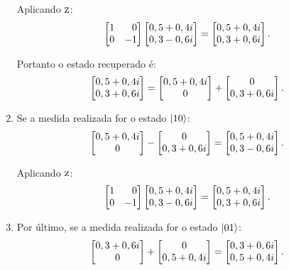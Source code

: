 \begin{enumerate}
        Aplicando \(\operatorname{\textsc{z}}\):
        \[
        \begin{bmatrix*}[r] 1 & 0 \\ 0 & -1 \end{bmatrix*}\begin{bmatrix*}[r] {\norma} \\ {0,3-0,6i} \end{bmatrix*} = \begin{bmatrix} {\norma} \\ {\normb} \end{bmatrix}.
        \]

        Portanto o estado recuperado é:
        \[
        \begin{bmatrix} {0,5+0,4i} \\ {0,3+0,6i} \end{bmatrix} = \begin{bmatrix} {0,5+0,4i} \\ 0 \end{bmatrix} +  \begin{bmatrix} 0 \\ {0,3+0,6i} \end{bmatrix}.
        \]

  \item Se a medida realizada for o estado $\ket{10}$:
        \[
        \begin{bmatrix} {\norma} \\ 0 \end{bmatrix} - \begin{bmatrix} 0 \\ {\normb} \end{bmatrix} = \begin{bmatrix*}[r] {\norma} \\ {0,3-0,6i} \end{bmatrix*}.
        \]

        Aplicando \(\operatorname{\textsc{z}}\):
        \[
        \begin{bmatrix*}[r] 1 & 0 \\ 0 & -1 \end{bmatrix*}\begin{bmatrix*}[r] {\norma} \\ {0,3-0,6i} \end{bmatrix*} = \begin{bmatrix} {\norma} \\ {\normb} \end{bmatrix}.
        \]

  \item Por último, se a medida realizada for o estado $\ket{01}$:
        \[
        \begin{bmatrix} {0,3+0,6i} \\ 0 \end{bmatrix} +  \begin{bmatrix} 0 \\ {0,5+0,4i} \end{bmatrix} = \begin{bmatrix} {0,3+0,6i} \\ {0,5+0,4i} \end{bmatrix}.
        \]


\end{enumerate}
